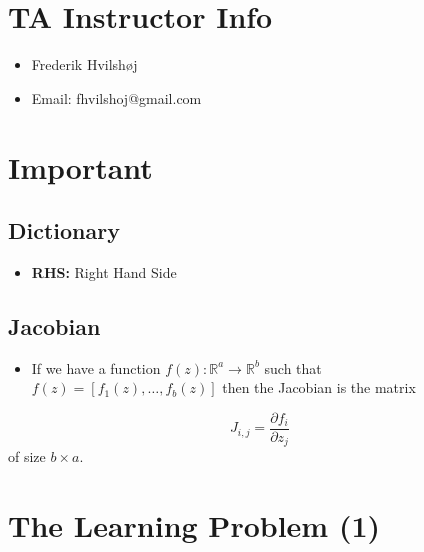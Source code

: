 \documentclass[11pt]{article}
\author{Martin Nørskov Jensen}
\date{\today}
\title{}
\begin{document}
\tableofcontents

\section{TA Instructor Info}
\label{sec:org5e28ac1}
\begin{itemize}
\item Frederik Hvilshøj
\item Email: fhvilshoj@gmail.com
\end{itemize}

\section{Important}
\label{sec:orgb6268e1}
\subsection{Dictionary}
\label{sec:org205a0ef}
\begin{itemize}
\item \textbf{RHS:} Right Hand Side
\end{itemize}

\subsection{Jacobian}
\label{sec:org6d5cf2b}
\begin{itemize}
\item If we have a function \(f(z): \mathbb{R}^{a} \rightarrow \mathbb{R}^b\) such that \(f(z) = [f_1(z),\dots, f_b(z)]\) then the Jacobian is the matrix
\end{itemize}
\begin{equation}
  J_{i,j} = \frac{\partial f_i}{\partial z_j}
\end{equation} 
of size \(b\times a\). 

\section{The Learning Problem (1)}
\label{sec:org22e236e}
\end{document}
